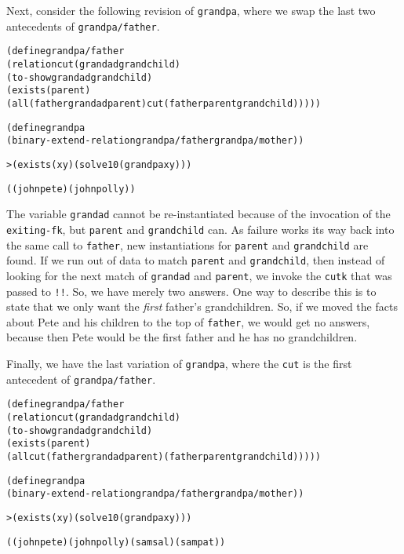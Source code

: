 Next, consider the following revision of \texttt{grandpa}, where
we swap the last two antecedents of \texttt{grandpa/father}.

\begin{alltt}
(define grandpa/father
  (relation cut (grandad grandchild)
    (to-show grandad grandchild)
    (exists (parent)
      (all (father grandad parent) cut (father parent grandchild)))))

(define grandpa
  (binary-extend-relation grandpa/father grandpa/mother))
\end{alltt}
\begin{alltt}
> (exists (x y) (solve 10 (grandpa x y)))

((john pete) (john polly))
\end{alltt}

\noindent 
The variable \texttt{grandad} cannot be re-instantiated because of the
invocation of the \texttt{exiting-fk}, but \texttt{parent} and
\texttt{grandchild} can. As failure works its way back into the same
call to \texttt{father}, new instantiations for \texttt{parent} and
\texttt{grandchild} are found.  If we run out of data to match
\texttt{parent} and \texttt{grandchild}, then instead of looking for
the next match of \texttt{grandad} and \texttt{parent}, we invoke the
\texttt{cutk} that was passed to \texttt{!!}. So, we have merely two
answers.  One way to describe this is to state that we only want the
\emph{first} father's grandchildren. So, if we moved the facts about
Pete and his children to the top of \texttt{father}, we would get no
answers, because then Pete would be the first father and he has no
grandchildren.

Finally, we have the last variation of \texttt{grandpa}, where the
\texttt{cut} is the first antecedent of \texttt{grandpa/father}.

\begin{alltt}
(define grandpa/father
  (relation cut (grandad grandchild)
    (to-show grandad grandchild)
    (exists (parent)
      (all cut (father grandad parent) (father parent grandchild)))))
\end{alltt}
\begin{alltt}
(define grandpa
  (binary-extend-relation grandpa/father grandpa/mother))
\end{alltt}

\begin{alltt}
> (exists (x y) (solve 10 (grandpa x y)))

((john pete) (john polly) (sam sal) (sam pat))
\end{alltt}

